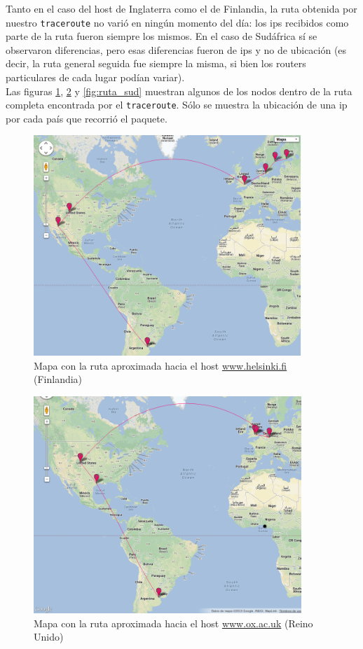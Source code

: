 Tanto en el caso del host de Inglaterra como el de Finlandia, la ruta obtenida por nuestro \texttt{traceroute} no varió en ningún momento del día: los ips recibidos como parte de la ruta fueron siempre los mismos. En el caso de Sudáfrica sí se observaron diferencias, pero esas diferencias fueron de ips y no de ubicación (es decir, la ruta general seguida fue siempre la misma, si bien los routers particulares de cada lugar podían variar).\\

Las figuras \ref{fig:ruta_fin}, \ref{fig:ruta_ing} y \ref{fig:ruta_sud} muestran algunos de los nodos dentro de la ruta completa encontrada por el \texttt{traceroute}. Sólo se muestra la ubicación de una ip por cada país que recorrió el paquete.

\begin{figure}[H]
  \centering
    \includegraphics[width=0.9\textwidth]{imgs/finlandia_ruta_1.png}
    \caption{Mapa con la ruta aproximada hacia el host \url{www.helsinki.fi} (Finlandia)}
    \label{fig:ruta_fin}
\end{figure}    

\begin{figure}[H]
  \centering
    \includegraphics[width=0.9\textwidth]{imgs/inglaterra_ruta_1.png}
    \caption{Mapa con la ruta aproximada hacia el host \url{www.ox.ac.uk} (Reino Unido)}
    \label{fig:ruta_ing}
\end{figure}

